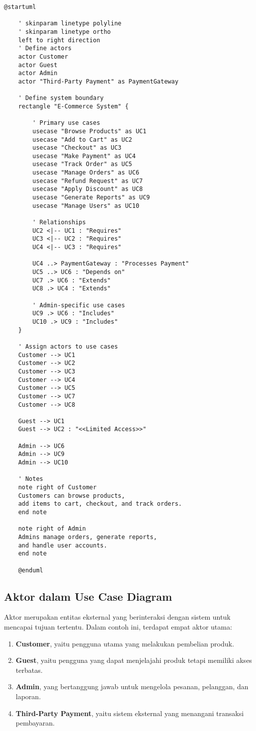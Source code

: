 \begin{lstlisting}[language=puml, caption={Use Case Diagram for E-Commerce System}]
	@startuml
	
	' skinparam linetype polyline
	' skinparam linetype ortho
	left to right direction
	' Define actors
	actor Customer
	actor Guest
	actor Admin
	actor "Third-Party Payment" as PaymentGateway
	
	' Define system boundary
	rectangle "E-Commerce System" {
		
		' Primary use cases
		usecase "Browse Products" as UC1
		usecase "Add to Cart" as UC2
		usecase "Checkout" as UC3
		usecase "Make Payment" as UC4
		usecase "Track Order" as UC5
		usecase "Manage Orders" as UC6
		usecase "Refund Request" as UC7
		usecase "Apply Discount" as UC8
		usecase "Generate Reports" as UC9
		usecase "Manage Users" as UC10
		
		' Relationships
		UC2 <|-- UC1 : "Requires"
		UC3 <|-- UC2 : "Requires"
		UC4 <|-- UC3 : "Requires"
		
		UC4 ..> PaymentGateway : "Processes Payment"
		UC5 ..> UC6 : "Depends on"
		UC7 .> UC6 : "Extends"
		UC8 .> UC4 : "Extends"
		
		' Admin-specific use cases
		UC9 .> UC6 : "Includes"
		UC10 .> UC9 : "Includes"
	}
	
	' Assign actors to use cases
	Customer --> UC1
	Customer --> UC2
	Customer --> UC3
	Customer --> UC4
	Customer --> UC5
	Customer --> UC7
	Customer --> UC8
	
	Guest --> UC1
	Guest --> UC2 : "<<Limited Access>>"
	
	Admin --> UC6
	Admin --> UC9
	Admin --> UC10
	
	' Notes
	note right of Customer
	Customers can browse products,
	add items to cart, checkout, and track orders.
	end note
	
	note right of Admin
	Admins manage orders, generate reports, 
	and handle user accounts.
	end note
	
	@enduml
\end{lstlisting}


\subsection{Aktor dalam Use Case Diagram}
Aktor merupakan entitas eksternal yang berinteraksi dengan sistem untuk mencapai tujuan tertentu. Dalam contoh ini, terdapat empat aktor utama:
\begin{enumerate}
	\item \textbf{Customer}, yaitu pengguna utama yang melakukan pembelian produk.
	\item \textbf{Guest}, yaitu pengguna yang dapat menjelajahi produk tetapi memiliki akses terbatas.
	\item \textbf{Admin}, yang bertanggung jawab untuk mengelola pesanan, pelanggan, dan laporan.
	\item \textbf{Third-Party Payment}, yaitu sistem eksternal yang menangani transaksi pembayaran.
\end{enumerate}

